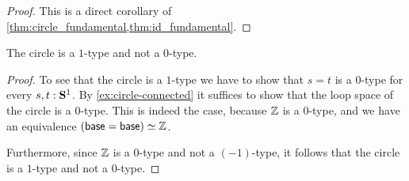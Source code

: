 \begin{proof}
  This is a direct corollary of \cref{thm:circle_fundamental,thm:id_fundamental}. 
\end{proof}

\begin{cor}
  The circle is a $1$-type and not a $0$-type.
\end{cor}

\begin{proof}
  To see that the circle is a $1$-type we have to show that $s=t$ is a $0$-type for every $s,t:\mathbf{S}^{1}$. By \cref{ex:circle-connected} it suffices to show that the loop space of the circle is a $0$-type. This is indeed the case, because ${\mathbb{Z}}$ is a $0$-type, and we have an equivalence $(\mathsf{base}=\mathsf{base})\simeq {\mathbb{Z}}$.

  Furthermore, since ${\mathbb{Z}}$ is a $0$-type and not a $(-1)$-type, it follows that the circle is a $1$-type and not a $0$-type.
\end{proof}

